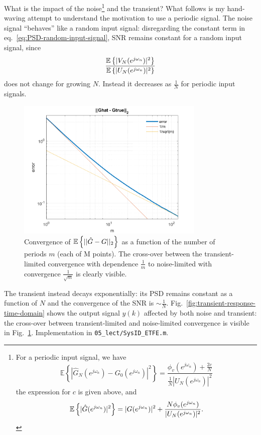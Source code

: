What is the impact of the noise\footnote{For a periodic input signal, we have
  \begin{equation}
    \label{eq:variance-ETFE}
    \mathbb{E}\left\{\left|\hat{G}_N(e^{j\omega_n}) - G_0(e^{j\omega_n})\right|^2\right\} = \frac{\phi_v(e^{j\omega_n}) + \frac{2c}{N}}{\frac{1}{N}|U_N(e^{j\omega_n})|^2}
  \end{equation}
  the expression for $c$ is given above, and
  \begin{equation*}
    \mathbb{E}\left\{|\hat{G}(e^{j\omega_n})|^2\right\} = |G(e^{j\omega_n})|^2 + \frac{N\phi_v(e^{j\omega_n})}{|U_N(e^{j\omega_n})|^2}.
  \end{equation*}} and the transient? What follows is my hand-waving attempt to understand the motivation to use a periodic signal. The noise signal ``behaves'' like a random input signal: disregarding the constant term in eq.~\eqref{eq:PSD-random-input-signal}, SNR remains constant for a random input signal, since
\begin{equation*}
  \frac{\mathbb{E}\left\{|V_N(e^{j\omega_n})|^2\right\}}{\mathbb{E}\left\{|U_N(e^{j\omega_n})|^2\right\}}
\end{equation*}
does not change for growing $N$. Instead it decreases as $\frac{1}{N}$ for periodic input signals.

\begin{figure}[h]
  \centering
  \includegraphics[width=0.8\textwidth]{"05_lect/transient-noise-convergence-avg.png"}
  \caption{Convergence of $\mathbb{E}\left\{||\hat{G}-G||_2\right\}$ as a function of the number of periods $m$ (each of M points). The cross-over between the transient-limited convergence with dependence $\frac{1}{m}$ to noise-limited with convergence $\frac{1}{\sqrt{m}}$ is clearly visible.}
  \label{fig:transient-response-convergence}
\end{figure}

The transient instead decays exponentially: its PSD remains constant as a function of $N$ and the convergence of the SNR is $\sim\frac{1}{N}$. Fig.~\ref{fig:transient-response-time-domain} shows the output signal $y(k)$ affected by both noise and transient: the cross-over between transient-limited and noise-limited convergence is visible in Fig.~\ref{fig:transient-response-convergence}. Implementation in \texttt{05\_lect/SysID\_ETFE.m}.


